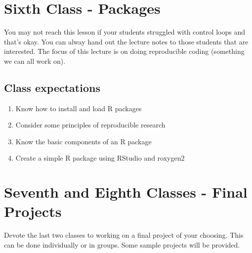\documentclass[paper=a4, fontsize=11pt]{scrartcl} %
\numberwithin{equation}{section} %
\numberwithin{figure}{section} %
\numberwithin{table}{section} %
\begin{document}

\section{Sixth Class - Packages}

You may not reach this lesson if your students struggled with control loops and that's okay. You can alway hand out the lecture notes to those students that are interested. The focus of this lecture is on doing reproducible coding (something we can all work on). 


\subsection{Class expectations}

\begin{enumerate}
\item Know how to install and load R packages
\item Consider some principles of reproducible research
\item Know the basic components of an R package
\item Create a simple R package using RStudio and roxygen2 
\end{enumerate}


\section{Seventh and Eighth Classes - Final Projects}

Devote the last two classes to working on a final project of your choosing. This can be done individually or in groups. Some sample projects will be provided.  

\end{document}
